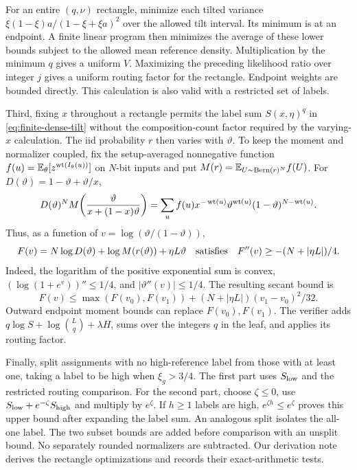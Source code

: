 For an entire $(q,\nu)$ rectangle, minimize each tilted variance
$\xi(1-\xi)a/(1-\xi+\xi a)^2$ over the allowed tilt interval. Its minimum
is at an endpoint. A finite linear program then minimizes the average of
these lower bounds subject to the allowed mean reference density.
Multiplication by the minimum $q$ gives a uniform $V$.
Maximizing the preceding likelihood ratio over integer $j$ gives a
uniform routing factor for the rectangle. Endpoint weights are bounded
directly. This calculation is also valid with a restricted set of labels.

Third, fixing $x$ throughout a rectangle permits the label sum
$S(x,\eta)^q$ in \eqref{eq:finite-dense-tilt} without the
composition-count factor required by the varying-$x$ calculation.
The iid probability $r$ then varies with $\vartheta$.
To keep the moment and normalizer coupled, fix the setup-averaged
nonnegative function $f(u)=\mathbb E_\theta[z^{\operatorname{wt}(I_\theta(u))}]$ on $N$-bit inputs
and put $M(r)=\mathbb E_{U\sim\mathrm{Bern}(r)^N}f(U)$. For
$D(\vartheta)=1-\vartheta+\vartheta/x$,
\[
 D(\vartheta)^N M\!\left(\frac{\vartheta}{x+(1-x)\vartheta}\right)
 =\sum_u f(u)x^{-\operatorname{wt}(u)}
          \vartheta^{\operatorname{wt}(u)}(1-\vartheta)^{N-\operatorname{wt}(u)}.
\]
Thus, as a function of $v=\log(\vartheta/(1-\vartheta))$,
\[
 F(v)=N\log D(\vartheta)+\log M(r(\vartheta))+\eta L\vartheta
 \quad\hbox{satisfies}\quad F''(v)\ge-(N+|\eta L|)/4.
\]
Indeed, the logarithm of the positive exponential sum is convex,
$(\log(1+e^v))''\le1/4$, and $|\vartheta''(v)|\le1/4$.
The resulting secant bound is
\[
 F(v)\le\max(F(v_0),F(v_1))
           +(N+|\eta L|)(v_1-v_0)^2/32.
\]
Outward endpoint moment bounds can replace $F(v_0),F(v_1)$.
The verifier adds $q\log S+\log\binom Lq+\lambda H$, sums over the
integers $q$ in the leaf, and applies its routing factor.

Finally, split assignments with no high-reference label from those with
at least one, taking a label to be high when $\xi_g>3/4$.
The first part uses $S_{\rm low}$ and the restricted routing comparison.
For the second part, choose $\zeta\le0$, use
$S_{\rm low}+e^{-\zeta}S_{\rm high}$ and multiply by $e^\zeta$.
If $h\ge1$ labels are high, $e^{\zeta h}\le e^\zeta$ proves this upper
bound after expanding the label sum. An analogous split isolates the
all-one label. The two subset bounds are added before comparison with an
unsplit bound. No separately rounded normalizers are subtracted.
Our derivation note  derives the rectangle
optimizations and records their exact-arithmetic tests.

